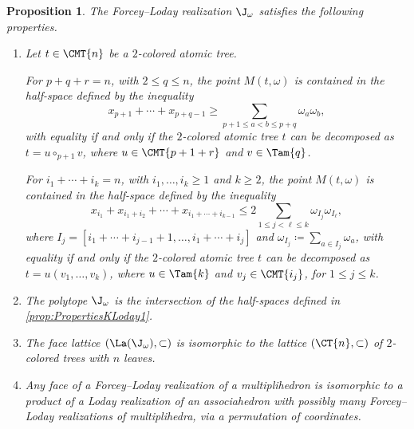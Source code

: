 \documentclass[JEP,XML,SOM,NoFloatCountersInSection,Unicode,published]{cedram}
\theoremstyle{definition}
\theoremstyle{plain}
\newtheorem{proposition}[definition]{Proposition}
\begin{document}
\begin{proposition}\label{prop:PropertiesKLoday}
The Forcey--Loday realization $\J_\omega$ satisfies the following properties.
\begin{enumerate}
\item\label{prop:PropertiesKLoday1} Let $t\in \CMT{n}$ be a $2$-colored atomic tree.

For $p+q+r=n$, with $2\leq q\leq n$, the point $M(t, \omega)$ is contained in the half-space defined by the inequality
\begin{equation}\tag{$\B$}\label{Eq:B}
x_{p+1}+\cdots+x_{p+q-1}\geq \sum_{p+1\leq a<b\leq p+q} \omega_a \omega_b,
\end{equation}
with equality if and only if the $2$-colored atomic tree $t$ can be decomposed as $t=u\circ_{p+1} v$, where $u\in\CMT{p+1+r}$ and $v\in \Tam{q}$.

For $i_1+\cdots+i_k=n$, with $i_1, \ldots,i_k\geq 1$ and $k\geq 2$, the point $M(t, \omega)$ is contained in the half-space defined by the inequality
\begin{equation}\label{Eq:T}\tag{$\T$}
x_{i_1}+x_{i_1+i_2}+\cdots+x_{i_1+\cdots+i_{k-1}}\leq
2\sum_{1\leq j<\ell\leq k} \omega_{I_j} \omega_{I_\ell},
\end{equation}
where $I_j=[i_1+\cdots +i_{j-1}+1, \ldots, i_1+\cdots +i_j]$ and $\omega_{I_j}\coloneqq\sum_{a\in I_j} \omega_a$, with equality if and only if the $2$-colored atomic tree $t$ can be decomposed as $t=u(v_1, \ldots, v_k)$, where $u\in\Tam{k}$ and $v_j\in \CMT{i_j}$, for $1\leq j\leq k$.

\item\label{prop:PropertiesKLoday2} The polytope $\J_\omega$ is the intersection of the half-spaces defined in \eqref{prop:PropertiesKLoday1}.

\item\label{prop:PropertiesKLoday3} The face lattice $(\La(\J_\omega), \subset)$ is isomorphic to the lattice $(\CT{n}, \subset)$ of $2$-colored trees with $n$ leaves.

\item\label{prop:PropertiesKLoday4} Any face of a Forcey--Loday realization of a multiplihedron is isomorphic to a product of a Loday realization of an associahedron with possibly many Forcey--Loday realizations of multiplihedra, via a permutation of coordinates.
\end{enumerate}
\end{proposition}
\end{document}

